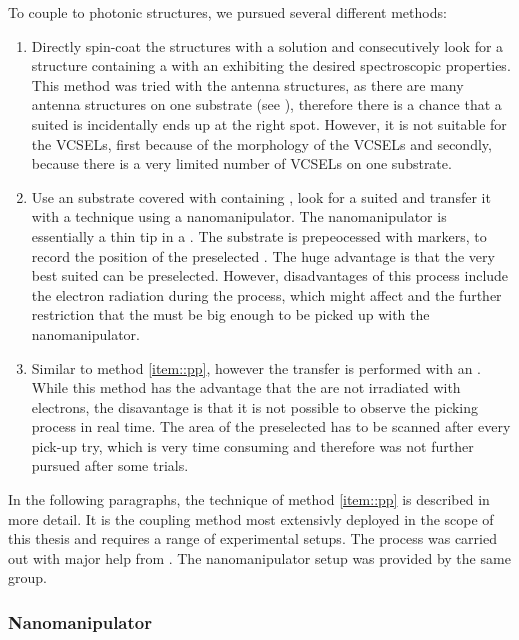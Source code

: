 	To couple \nds to photonic structures, we pursued several different methods: 
	\begin{enumerate} 
		\item Directly spin-coat the structures with a \nd solution and consecutively look for a structure containing a \nds with an \siv exhibiting the desired spectroscopic properties. This method was tried with the antenna structures, as there are many antenna structures on one substrate (see ), therefore there is a chance that a suited \nd is incidentally ends up at the right spot. However, it is not suitable for the VCSELs, first because of the morphology of the VCSELs and secondly, because there is a very limited number of VCSELs on one substrate.
		\item \label{item::pp}Use an \ir substrate covered with \nds containing \sivs, look for a suited \nd and transfer it with a \pp technique using a nanomanipulator. The nanomanipulator is essentially a thin tip in a \sem. The \ir substrate is prepeocessed with markers, to record the position of the preselected \nd. The huge advantage is that the very best suited \nd can be preselected. However, disadvantages of this process include the electron radiation during the \pp process, which might affect \siv \fl and the further restriction that the \nds must be big enough to be picked up with the nanomanipulator. 
		\item Similar to method \ref{item::pp}, however the transfer is performed with an \afm. While this method has the advantage that the \nds are not irradiated with electrons, the disavantage is that it is not possible to  observe the picking process in real time. The area of the preselected \nd has to be scanned after every pick-up try, which is very time consuming and therefore was not further pursued after some trials.
	\end{enumerate}

	In the following paragraphs, the \pp technique of method \ref{item::pp} is described in more detail.
	It is the coupling method most extensivly deployed in the scope of this thesis and requires a range of experimental setups. 
	The \pp process was carried out with major help from \pauly.
	The nanomanipulator setup was provided by the same group.
	\\
	\subsubsection{Nanomanipulator}

